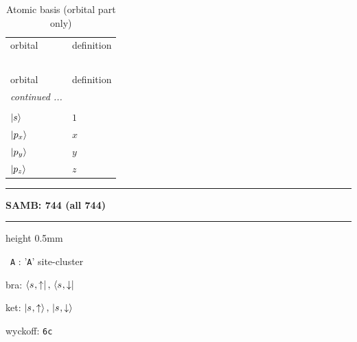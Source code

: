 \documentclass[fleqn,10pt,landscape]{jsarticle}
\begin{document}
\begin{longtable}[l]{ll}
\captionsetup{justification=raggedright, singlelinecheck=off}
\caption{Atomic basis (orbital part only)}
 \\
 \hline \hline
orbital & definition \\ \hline \endfirsthead

\multicolumn{1}{l}{\tablename\ \thetable{}} \\
 \hline \hline
orbital & definition \\ \hline \endhead

 \hline \hline
\multicolumn{1}{r}{\footnotesize\it continued ...} \\ \endfoot

 \hline \hline
\multicolumn{1}{r}{} \\ \endlastfoot

$ \ket{s} $ & $ 1 $ \\ \hline
$ \ket{p_{x}} $ & $ x $ \\
$ \ket{p_{y}} $ & $ y $ \\
$ \ket{p_{z}} $ & $ z $ \\
\end{longtable}
\vspace{5mm}
\noindent \rule[0.5mm]{5mm}{0.5mm}\hspace{3mm}\textbf{SAMB: 744 (all 744)}\hspace{3mm}\leaders\hrule height 0.5mm\hfill\kern0pt
\vspace{3mm}

\vspace{5mm}

\noindent\textbullet\, \texttt{A} : '\texttt{A}' site-cluster

\noindent\quad * bra: $\bra{s_{},\uparrow},\, \bra{s_{},\downarrow}$

\noindent\quad * ket: $\ket{s_{},\uparrow},\, \ket{s_{},\downarrow}$

\noindent\quad * wyckoff: \texttt{6c}
\end{document}
